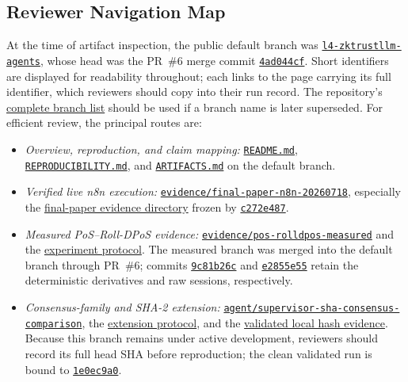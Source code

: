 \documentclass[journal]{IEEEtran}
\newcommand{\branchlink}[2]{%
  \href{https://github.com/Sudarson2021/zktrustllm-agents-l4/tree/#1}{%
  \texttt{#2}}}
\newcommand{\commitlink}[1]{%
  \href{https://github.com/Sudarson2021/zktrustllm-agents-l4/commit/#1}{%
  \texttt{#1}}}
\newcommand{\commitlinkx}[2]{%
  \href{https://github.com/Sudarson2021/zktrustllm-agents-l4/commit/#1}{%
  \texttt{#2}}}
\begin{document}
\subsection{Reviewer Navigation Map}
At the time of artifact inspection, the public default branch was
\branchlink{l4-zktrustllm-agents}{l4-zktrustllm-agents}, whose head was the
PR~\#6 merge commit \commitlinkx{4ad044cfed2c21824f62bccd3967b9d687f07993}{4ad044cf}.
Short identifiers are displayed for readability throughout; each links to the
page carrying its full identifier, which reviewers should copy into their run
record.
The repository's
\href{https://github.com/Sudarson2021/zktrustllm-agents-l4/branches}
{complete branch list} should be used if a branch name is later superseded.
For efficient review, the principal routes are:
\begin{itemize}
\item \emph{Overview, reproduction, and claim mapping:}
\href{https://github.com/Sudarson2021/zktrustllm-agents-l4/blob/l4-zktrustllm-agents/README.md}
{\texttt{README.md}},
\href{https://github.com/Sudarson2021/zktrustllm-agents-l4/blob/l4-zktrustllm-agents/REPRODUCIBILITY.md}
{\texttt{REPRODUCIBILITY.md}}, and
\href{https://github.com/Sudarson2021/zktrustllm-agents-l4/blob/l4-zktrustllm-agents/ARTIFACTS.md}
{\texttt{ARTIFACTS.md}} on the default branch.
\item \emph{Verified live n8n execution:}
\branchlink{evidence/final-paper-n8n-20260718}
{evidence/final-paper-n8n-20260718}, especially the
\href{https://github.com/Sudarson2021/zktrustllm-agents-l4/tree/evidence/final-paper-n8n-20260718/docs/l4/supervisor_258/evidence/final_paper_n8n_20260718}
{final-paper evidence directory} frozen by
\commitlinkx{c272e487ca6f2fecda1496ff9389ed8e1dce90d9}{c272e487}.
\item \emph{Measured PoS--Roll-DPoS evidence:}
\branchlink{evidence/pos-rolldpos-measured}
{evidence/pos-rolldpos-measured} and the
\href{https://github.com/Sudarson2021/zktrustllm-agents-l4/blob/l4-zktrustllm-agents/docs/l4/consensus/POS_ROLLDPOS_EXPERIMENT.md}
{experiment protocol}. The measured branch was merged into the default branch
through PR~\#6; commits \commitlink{9c81b26c} and
\commitlinkx{e2855e555326e7f4efec971faf19f948159831cd}{e2855e55} retain the
deterministic derivatives and raw sessions, respectively.
\item \emph{Consensus-family and SHA-2 extension:}
\branchlink{agent/supervisor-sha-consensus-comparison}
{agent/supervisor-sha-\allowbreak consensus-comparison}, the
\href{https://github.com/Sudarson2021/zktrustllm-agents-l4/blob/agent/supervisor-sha-consensus-comparison/docs/l4/consensus/SHA2_CONSENSUS_EXTENSION.md}
{extension protocol}, and the
\href{https://github.com/Sudarson2021/zktrustllm-agents-l4/tree/agent/supervisor-sha-consensus-comparison/runtime_artifacts/hash_microbenchmark/2026-07-25-hardhat-clean}
{validated local hash evidence}. Because this branch remains under active
development, reviewers should record its full head SHA before reproduction;
the clean validated run is bound to \commitlink{1e0ec9a0}.
\end{itemize}
\end{document}
